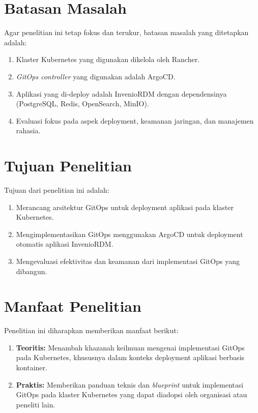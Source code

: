 \section{Batasan Masalah}

Agar penelitian ini tetap fokus dan terukur, batasan masalah yang ditetapkan adalah:

\begin{enumerate}
  \item Klaster Kubernetes yang digunakan dikelola oleh Rancher.
  \item \textit{GitOps controller} yang digunakan adalah ArgoCD.
  \item Aplikasi yang di-deploy adalah InvenioRDM dengan dependensinya (PostgreSQL, Redis, OpenSearch, MinIO).
  \item Evaluasi fokus pada aspek deployment, keamanan jaringan, dan manajemen rahasia.
\end{enumerate}

\section{Tujuan Penelitian}

Tujuan dari penelitian ini adalah:

\begin{enumerate}
  \item Merancang arsitektur GitOps untuk deployment aplikasi pada klaster Kubernetes.
  \item Mengimplementasikan GitOps menggunakan ArgoCD untuk deployment otomatis aplikasi InvenioRDM.
  \item Mengevaluasi efektivitas dan keamanan dari implementasi GitOps yang dibangun.
\end{enumerate}

\section{Manfaat Penelitian}

Penelitian ini diharapkan memberikan manfaat berikut:

\begin{enumerate}
  \item \textbf{Teoritis:} Menambah khazanah keilmuan mengenai implementasi GitOps pada Kubernetes, khususnya dalam konteks deployment aplikasi berbasis kontainer.
  \item \textbf{Praktis:} Memberikan panduan teknis dan \textit{blueprint} untuk implementasi GitOps pada klaster Kubernetes yang dapat diadopsi oleh organisasi atau peneliti lain.
\end{enumerate}

